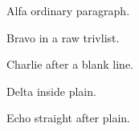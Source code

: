 \documentclass[10pt]{article}
\newenvironment{plain}{\par}{\par}
\begin{document}
Alfa ordinary paragraph.
\trivlist\item\relax Bravo in a raw trivlist.\endtrivlist

Charlie after a blank line.
\begin{plain}Delta inside plain.\end{plain}
Echo straight after plain.
\end{document}
